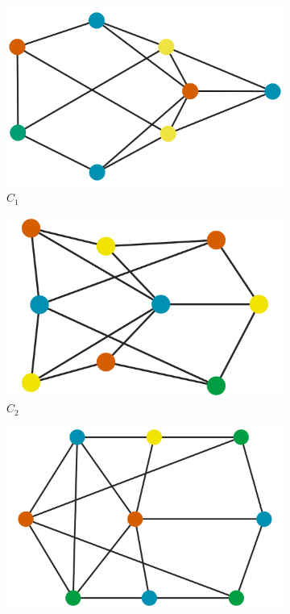 \documentclass[12pt]{amsart}
\theoremstyle{plain}
\numberwithin{equation}{section}
\begin{document}
\begin{figure}[H]
	\centering
	\begin{subfigure}[b]{0.22\textwidth}
		\centering
		\includegraphics[width =\columnwidth]{./figures/C1_dg.pdf}
		\caption{$C_1$}
	\end{subfigure}
	\hfill
	\begin{subfigure}[b]{0.22\textwidth}
		\centering
		\includegraphics[width =\columnwidth]{./figures/C2_dg.pdf}
		\caption{$C_2$}
	\end{subfigure}
	\hfill
	\begin{subfigure}[b]{0.22\textwidth}
		\centering
		\includegraphics[width =\columnwidth]{./figures/C3_dg.pdf}

\end{subfigure}
\end{figure}
\end{document}
